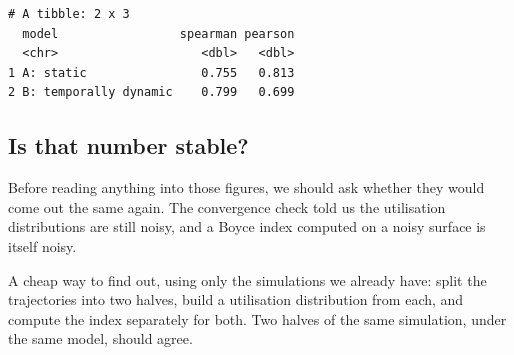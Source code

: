 \documentclass[
  letterpaper,
  DIV=11,
  numbers=noendperiod]{scrartcl}
\newenvironment{Shaded}{\begin{snugshade}}{\end{snugshade}}
\newcommand{\AttributeTok}[1]{\textcolor[rgb]{0.40,0.45,0.13}{#1}}
\newcommand{\FunctionTok}[1]{\textcolor[rgb]{0.28,0.35,0.67}{#1}}
\newcommand{\NormalTok}[1]{\textcolor[rgb]{0.00,0.23,0.31}{#1}}
\newcommand{\OtherTok}[1]{\textcolor[rgb]{0.00,0.23,0.31}{#1}}
\newcommand{\SpecialCharTok}[1]{\textcolor[rgb]{0.37,0.37,0.37}{#1}}
\newcommand{\StringTok}[1]{\textcolor[rgb]{0.13,0.47,0.30}{#1}}
\begin{document}
\begin{Shaded}
\end{Shaded}

\begin{verbatim}
# A tibble: 2 x 3
  model                 spearman pearson
  <chr>                    <dbl>   <dbl>
1 A: static                0.755   0.813
2 B: temporally dynamic    0.799   0.699
\end{verbatim}

\subsection{Is that number stable?}\label{is-that-number-stable}

Before reading anything into those figures, we should ask whether they
would come out the same again. The convergence check told us the
utilisation distributions are still noisy, and a Boyce index computed on
a noisy surface is itself noisy.

A cheap way to find out, using only the simulations we already have:
split the trajectories into two halves, build a utilisation distribution
from each, and compute the index separately for both. Two halves of the
same simulation, under the same model, should agree.
\end{document}

